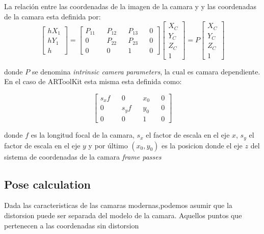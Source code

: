 \documentclass[runningheads]{llncs}
\begin{document}
	La relación entre las coordenadas de la imagen de la camara y y las coordenadas de la camara esta definida por:
	\[
	\begin{bmatrix}
	hX_{1} \\
	hY_{1} \\
	h 
	\end{bmatrix} =
	\begin{bmatrix}
	P_{11} && P_{12} && P_{13} && 0\\ 
	0 && P_{22} && P_{23} && 0\\
	0 && 0 && 1 && 0
	\end{bmatrix} 
	\begin{bmatrix}
	X_{C} \\
	Y_{C} \\
	Z_{C} \\
	1
	\end{bmatrix} = P \begin{bmatrix}
	X_{C} \\
	Y_{C} \\
	Z_{C} \\
	1
	\end{bmatrix}
	\]
	
	donde $P$ se denomina \textit{intrinsic camera parameters}, la cual es camara dependiente. En el caso de ARToolKit esta misma esta definida como:
	
	\[
	\begin{bmatrix}
	s_{x}f && 0 && x_{0} && 0\\ 
	0 && s_{y}f && y_{0} && 0\\
	0 && 0 && 1 && 0
	\end{bmatrix} 
	\]
	
	donde $f$ es la longitud focal de la camara, $s_{x}$ el factor de escala en el eje $x$, $s_{y}$ el factor de escala en el eje $y$ y por último $(x_{0},y_{0})$ es la posicion donde el eje $z$ del sistema de coordenadas de la camara \textit{frame passes}
	
	
	\subsection{Pose calculation}
	
	Dada las caracteristicas de las camaras modernas,podemos asumir que la distorsion puede ser separada del modelo de la camara. Aquellos puntos que pertenecen a las coordenadas sin distorsion %
\end{document}
